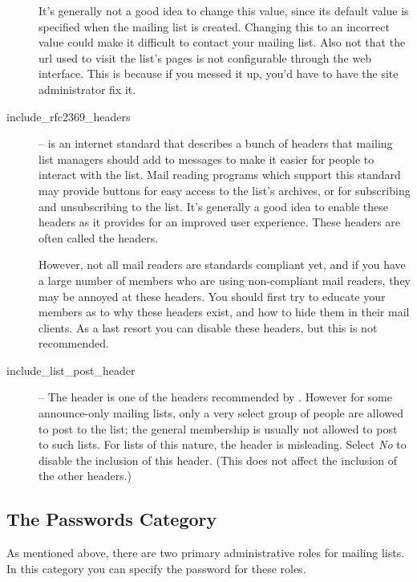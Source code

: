 \documentclass{howto}
\begin{document}
\begin{description}
    It's generally not a good idea to change this value, since its
    default value is specified when the mailing list is created.
    Changing this to an incorrect value could make it difficult to
    contact your mailing list.  Also not that the url used to visit
    the list's pages is not configurable through the web interface.
    This is because if you messed it up, you'd have to have the site
    administrator fix it.

\item[include_rfc2369_headers] --
     is an internet standard that describes a bunch of
    headers that mailing list managers should add to messages to make
    it easier for people to interact with the list.  Mail reading
    programs which support this standard may provide buttons for easy
    access to the list's archives, or for subscribing and
    unsubscribing to the list.  It's generally a good idea to enable
    these headers as it provides for an improved user experience.
    These headers are often called the  headers.

    However, not all mail readers are standards compliant yet, and if
    you have a large number of members who are using non-compliant
    mail readers, they may be annoyed at these headers.  You should
    first try to educate your members as to why these headers exist,
    and how to hide them in their mail clients.  As a last resort you
    can disable these headers, but this is not recommended.

\item[include_list_post_header] --
    The  header is one of the headers
    recommended by .  However for some announce-only mailing
    lists, only a very select group of people are allowed to post to
    the list; the general membership is usually not allowed to post to
    such lists.  For lists of this nature, the 
    header is misleading.  Select \emph{No} to disable the inclusion
    of this header. (This does not affect the inclusion of the other
     headers.)
\end{description}

\subsection{The Passwords Category}
As mentioned above, there are two primary administrative roles for
mailing lists.  In this category you can specify the password for
these roles.
\end{document}
